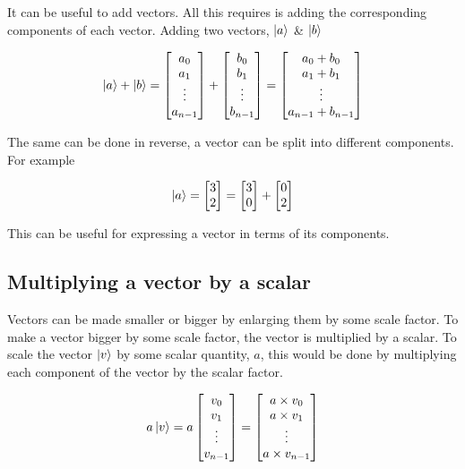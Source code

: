 \documentclass{book}
\begin{document}
It can be useful to add vectors. All this requires is adding the corresponding components of each vector. Adding two vectors, $\ket{a}$ \& $\ket{b}$

$$\ket{a} + \ket{b} = \begin{bmatrix} a_0 \\ a_1 \\ \vdots \\ a_{n-1} \end{bmatrix} + \begin{bmatrix} b_0 \\ b_1 \\ \vdots \\ b_{n-1} \end{bmatrix} = \begin{bmatrix} a_0 + b_0 \\ a_1 + b_1 \\ \vdots \\ a_{n-1} + b_{n-1} \end{bmatrix} $$

The same can be done in reverse, a vector can be split into different components. For example 

$$
\ket{a} = \begin{bmatrix} 3 \\ 2 \end{bmatrix} = \begin{bmatrix} 3 \\ 0 \end{bmatrix} + \begin{bmatrix} 0 \\ 2 \end{bmatrix}
$$

This can be useful for expressing a vector in terms of its components. 

\subsection{ Multiplying a vector by a scalar }

Vectors can be made smaller or bigger by enlarging them by some scale factor. To make a vector bigger by some scale factor, the vector is multiplied by a scalar. To scale the vector $\ket{v}$ by some scalar quantity, $a$, this would be done by multiplying each component of the vector by the scalar factor. 

$$
a \ket{v} = a\begin{bmatrix} v_0 \\ v_1 \\ \vdots \\ v_{n-1} \end{bmatrix} = \begin{bmatrix} a \times v_0 \\ a \times v_1 \\ \vdots \\ a \times v_{n-1} \end{bmatrix} 
$$
\end{document}
